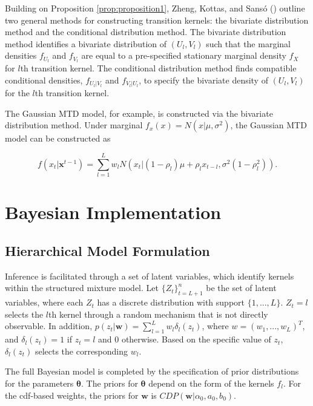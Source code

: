 \documentclass[
  letterpaper,
  double,
  12pt,
  1.0in]{beavtex}
\begin{document}
Building on Proposition \ref{prop:proposition1}, Zheng, Kottas, and
Sansó () outline two general
methods for constructing transition kernels: the bivariate distribution
method and the conditional distribution method. The bivariate
distribution method identifies a bivariate distribution of
\((U_l, V_l)\) such that the marginal densities \(f_{U_l}\) and
\(f_{V_l}\) are equal to a pre-specified stationary marginal density
\(f_X\) for \(l\)th transition kernel. The conditional distribution
method finds compatible conditional densities, \(f_{U_l|V_l}\) and
\(f_{V_l|U_l}\), to specify the bivariate density of \((U_l, V_l)\) for
the \(l\)th transition kernel.

The Gaussian MTD model, for example, is constructed via the bivariate
distribution method. Under marginal \(f_x(x) = N(x | \mu, \sigma^2)\),
the Gaussian MTD model can be constructed as

\begin{equation}
f(x_t | \textbf{x}^{t-1}) = \sum_{l=1}^L w_l N(x_t | (1 - \rho_l) \mu + \rho_l x_{t-l}, \sigma^2 (1 - \rho_l^2)). 
\end{equation}

\section{Bayesian Implementation}\label{bayesianimplementation}

\subsection{Hierarchical Model
Formulation}\label{hierarchicalmodelformulation}

Inference is facilitated through a set of latent variables, which
identify kernels within the structured mixture model. Let
\({\{Z_t\}}_{t=L+1}^n\) be the set of latent variables, where each
\(Z_t\) has a discrete distribution with support \(\{1,...,L\}\).
\(Z_t = l\) selects the \(l\)th kernel through a random mechanism that
is not directly observable. In addition,
\(p(z_t | \boldsymbol{w}) = \sum_{l=1}^L w_l \delta_l(z_t)\), where
\(w = {(w_1,..., w_L)}^T\), and \(\delta_l(z_t) = 1\) if \(z_t = l\) and
\(0\) otherwise. Based on the specific value of \(z_t\),
\(\delta_l(z_t)\) selects the corresponding \(w_l\).

The full Bayesian model is completed by the specification of prior
distributions for the parameters \(\boldsymbol{\theta}\). The priors for
\(\boldsymbol{\theta}\) depend on the form of the kernels \(f_l\). For
the cdf-based weights, the priors for \(\boldsymbol{w}\) is
\(CDP(\boldsymbol{w} | \alpha_0, a_0, b_0)\).
\end{document}
